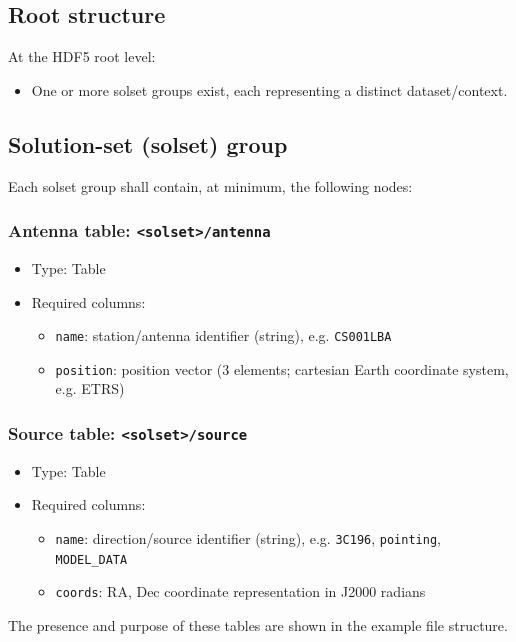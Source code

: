 \documentclass[a4paper,10pt,bibtotoc]{scrartcl}
\begin{document}
\subsection{Root structure}
At the HDF5 root level:
\begin{itemize}
  \item One or more solset groups exist, each representing a distinct dataset/context.
\end{itemize}

\subsection{Solution-set (solset) group}
Each solset group shall contain, at minimum, the following nodes:

\subsubsection*{Antenna table: \texttt{<solset>/antenna}}
\begin{itemize}
  \item Type: Table
  \item Required columns:
  \begin{itemize}
    \item \texttt{name}: station/antenna identifier (string), e.g. \texttt{CS001LBA}
    \item \texttt{position}: position vector (3 elements; cartesian Earth coordinate system, e.g. ETRS)
  \end{itemize}
\end{itemize}

\subsubsection*{Source table: \texttt{<solset>/source}}
\begin{itemize}
  \item Type: Table
  \item Required columns:
  \begin{itemize}
    \item \texttt{name}: direction/source identifier (string), e.g. \texttt{3C196}, \texttt{pointing}, \texttt{MODEL\_DATA}
    \item \texttt{coords}: RA, Dec coordinate representation in J2000 radians
  \end{itemize}
\end{itemize}
The presence and purpose of these tables are shown in the example file structure. 
\end{document}
